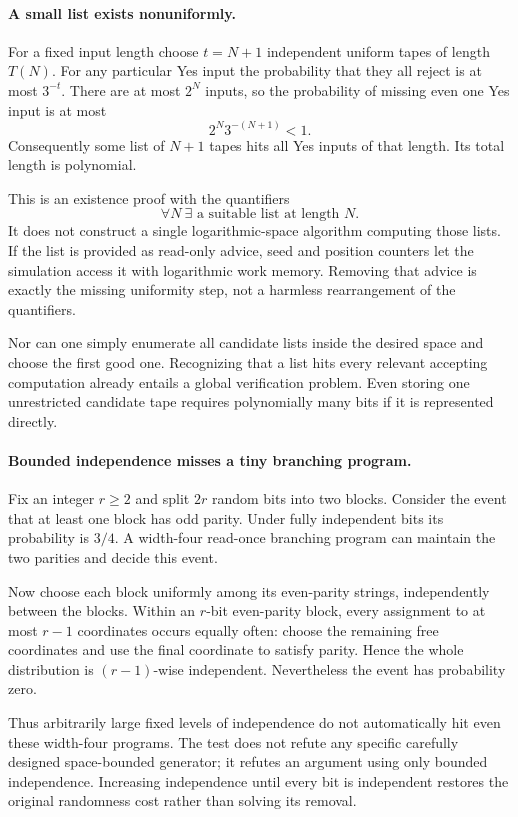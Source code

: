\documentclass[11pt]{article}
\begin{document}
\paragraph{A small list exists nonuniformly.}
For a fixed input length choose $t=N+1$ independent uniform tapes of length $T(N)$. For any particular Yes input the probability that they all reject is at most $3^{-t}$. There are at most $2^N$ inputs, so the probability of missing even one Yes input is at most
\[
 2^N3^{-(N+1)}<1.
\]
Consequently some list of $N+1$ tapes hits all Yes inputs of that length. Its total length is polynomial.

This is an existence proof with the quantifiers
\[
 \forall N\ \exists\text{ a suitable list at length }N.
\]
It does not construct a single logarithmic-space algorithm computing those lists. If the list is provided as read-only advice, seed and position counters let the simulation access it with logarithmic work memory. Removing that advice is exactly the missing uniformity step, not a harmless rearrangement of the quantifiers.

Nor can one simply enumerate all candidate lists inside the desired space and choose the first good one. Recognizing that a list hits every relevant accepting computation already entails a global verification problem. Even storing one unrestricted candidate tape requires polynomially many bits if it is represented directly.

\paragraph{Bounded independence misses a tiny branching program.}
Fix an integer $r\ge2$ and split $2r$ random bits into two blocks. Consider the event that at least one block has odd parity. Under fully independent bits its probability is $3/4$. A width-four read-once branching program can maintain the two parities and decide this event.

Now choose each block uniformly among its even-parity strings, independently between the blocks. Within an $r$-bit even-parity block, every assignment to at most $r-1$ coordinates occurs equally often: choose the remaining free coordinates and use the final coordinate to satisfy parity. Hence the whole distribution is $(r-1)$-wise independent. Nevertheless the event has probability zero.

Thus arbitrarily large fixed levels of independence do not automatically hit even these width-four programs. The test does not refute any specific carefully designed space-bounded generator; it refutes an argument using only bounded independence. Increasing independence until every bit is independent restores the original randomness cost rather than solving its removal.
\end{document}
